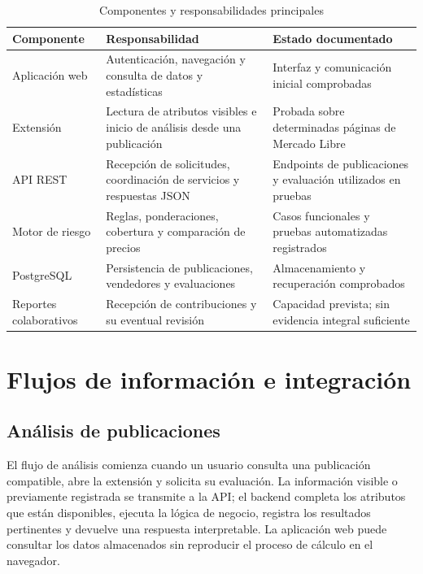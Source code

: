 \begin{table}[htbp]
\centering
\caption{Componentes y responsabilidades principales}
\label{tab:ml-responsabilidades}
\small
\begin{tabularx}{\textwidth}{@{}p{} X p{}@{}}
\toprule
\textbf{Componente} & \textbf{Responsabilidad} & \textbf{Estado documentado} \\
\midrule
Aplicación web & Autenticación, navegación y consulta de datos y estadísticas & Interfaz y comunicación inicial comprobadas \\
Extensión & Lectura de atributos visibles e inicio de análisis desde una publicación & Probada sobre determinadas páginas de Mercado Libre \\
API REST & Recepción de solicitudes, coordinación de servicios y respuestas JSON & Endpoints de publicaciones y evaluación utilizados en pruebas \\
Motor de riesgo & Reglas, ponderaciones, cobertura y comparación de precios & Casos funcionales y pruebas automatizadas registrados \\
PostgreSQL & Persistencia de publicaciones, vendedores y evaluaciones & Almacenamiento y recuperación comprobados \\
Reportes colaborativos & Recepción de contribuciones y su eventual revisión & Capacidad prevista; sin evidencia integral suficiente \\
\bottomrule
\end{tabularx}
\end{table}

\section{Flujos de información e integración}\label{sec:ml-flujos}

\subsection{Análisis de publicaciones}\label{subsec:ml-flujo-analisis}

El flujo de análisis comienza cuando un usuario consulta una publicación compatible, abre la extensión y solicita su evaluación. La información visible o previamente registrada se transmite a la API; el backend completa los atributos que están disponibles, ejecuta la lógica de negocio, registra los resultados pertinentes y devuelve una respuesta interpretable. La aplicación web puede consultar los datos almacenados sin reproducir el proceso de cálculo en el navegador.

